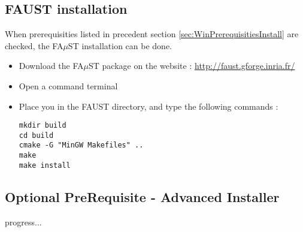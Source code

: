\subsection{FAUST installation}\label{sec:WinFaustInstall}
When prerequisities listed in precedent section \ref{sec:WinPrerequisitiesInstall} are checked, the FA$\mu$ST installation can be done. 
\begin{itemize}
\item Download the FA$\mu$ST package on the website :  \url{http://faust.gforge.inria.fr/}
\item Open a command terminal
\item Place you in the FAUST directory, and type the following commands : 
\begin{lstlisting}
mkdir build
cd build
cmake -G "MinGW Makefiles" ..
make
make install
\end{lstlisting}
\end{itemize}


\subsection{Optional PreRequisite - Advanced Installer}\label{sec:WinOptionalInstall}

progress... 



